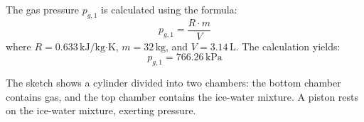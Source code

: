The gas pressure \( p_{g,1} \) is calculated using the formula:  
\[
p_{g,1} = \frac{R \cdot m}{V}
\]  
where \( R = 0.633 \, \text{kJ/kg·K} \), \( m = 32 \, \text{kg} \), and \( V = 3.14 \, \text{L} \).  
The calculation yields:  
\[
p_{g,1} = 766.26 \, \text{kPa}
\]  

The sketch shows a cylinder divided into two chambers: the bottom chamber contains gas, and the top chamber contains the ice-water mixture. A piston rests on the ice-water mixture, exerting pressure.